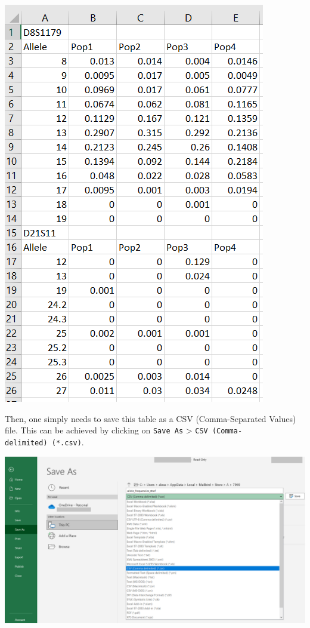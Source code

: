 \documentclass[
]{book}
\begin{document}
\includegraphics[width=1\linewidth]{img/capture_ref_excel_1}

Then, one simply needs to save this table as a CSV (Comma-Separated Values) file. This can be
achieved by clicking on \texttt{Save\ As} \textgreater{} \texttt{CSV\ (Comma-delimited)\ (*.csv)}.

\includegraphics[width=1\linewidth]{img/capture_ref_excel_2}
\end{document}
